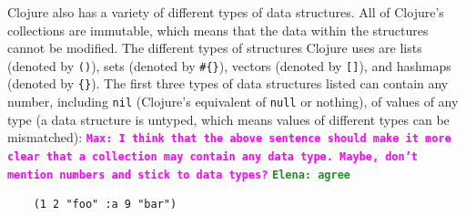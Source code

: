 \documentclass[12pt]{article}
\newcommand{\comment}[1]{{\bf \tt  {#1}}}
\newcommand{\emcomment}[1]{\textcolor{ForestGreen}{\comment{Elena: {#1}}}}
\newcommand{\mmcomment}[1]{\textcolor{magenta}{\comment{Max: {#1}}}}
\begin{document}


Clojure also has a variety of different types of data structures. All 
of Clojure's collections are immutable, which means that the data within the structures cannot be modified. 
The different types of structures Clojure uses are lists (denoted by \texttt{()}),
sets (denoted by \texttt{\#\{\}}), vectors (denoted by \texttt{[]}),
and hashmaps (denoted by \texttt{\{\}}). The first three types of data
structures listed can contain any number, including \texttt{nil} (Clojure's equivalent of \texttt{null} or nothing), of 
values of any type (a data structure is untyped, which means values of different types can be  
mismatched):
\mmcomment{I think that the above sentence should make it more clear that a collection may contain any data type. Maybe, don't mention numbers and stick to data types?}
\emcomment{agree}
\begin{verbatim}
	(1 2 "foo" :a 9 "bar")
\end{verbatim}


\end{document}
